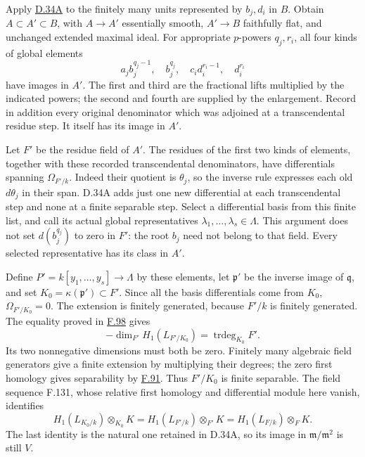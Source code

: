 \documentclass[11pt,a4paper,openany]{report}
\newcounter{none}
\begin{document}
Apply \hyperref[AG-RG-S05-smoothing-artinian-denominator-enlargement]{D.34A} to the finitely many units represented by \(b_j,d_i\) in \(B\). Obtain \(A\subset A'\subset B\), with \(A\to A'\) essentially smooth, \(A'\to B\) faithfully flat, and unchanged extended maximal ideal. For appropriate \(p\)-powers \(q_j,r_i\), all four kinds of global elements \[
a_jb_j^{q_j-1},\quad b_j^{q_j},\quad
c_id_i^{r_i-1},\quad d_i^{r_i}
\] have images in \(A'\). The first and third are the fractional lifts multiplied by the indicated powers; the second and fourth are supplied by the enlargement. Record in addition every original denominator which was adjoined at a transcendental residue step. It itself has its image in \(A'\).

Let \(F'\) be the residue field of \(A'\). The residues of the first two kinds of elements, together with these recorded transcendental denominators, have differentials spanning \(\Omega_{F'/k}\). Indeed their quotient is \(\theta_j\), so the inverse rule expresses each old \(d\theta_j\) in their span. D.34A adds just one new differential at each transcendental step and none at a finite separable step. Select a differential basis from this finite list, and call its actual global representatives \(\lambda_1,\ldots,\lambda_s\in\Lambda\). This argument does not set \(d(b_j^{q_j})\) to zero in \(F'\): the root \(b_j\) need not belong to that field. Every selected representative has its class in \(A'\).

Define \(P'=k[y_1,\ldots,y_s]\to\Lambda\) by these elements, let \(\mathfrak p'\) be the inverse image of \(\mathfrak q\), and set \(K_0=\kappa(\mathfrak p')\subset F'\). Since all the basis differentials come from \(K_0\), \(\Omega_{F'/K_0}=0\). The extension is finitely generated, because \(F'/k\) is finitely generated. The equality proved in \hyperref[AG-RG-S05-more-algebra-lemma-cartier-equality]{F.98} gives \[
-\dim_{F'}H_1(L_{F'/K_0})
=\operatorname{trdeg}_{K_0}F'.
\] Its two nonnegative dimensions must both be zero. Finitely many algebraic field generators give a finite extension by multiplying their degrees; the zero first homology gives separability by \hyperref[AG-RG-S05-algebra-proposition-characterize-separable-field-extensions]{F.91}. Thus \(F'/K_0\) is finite separable. The field sequence F.131, whose relative first homology and differential module here vanish, identifies \[
H_1(L_{K_0/k})\otimes_{K_0}K
=H_1(L_{F'/k})\otimes_{F'}K
=H_1(L_{F/k})\otimes_FK.
\] The last identity is the natural one retained in D.34A, so its image in \(\mathfrak m/\mathfrak m^2\) is still \(V\).
\end{document}
